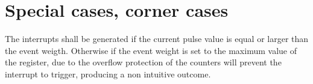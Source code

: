 \section{Special cases, corner cases}
The interrupts shall be generated if the current pulse value is equal or larger than the event weigth. Otherwise if the event weight is set to the maximum value of the register, due to the overflow protection of the counters will prevent the interrupt to trigger, producing a non intuitive outcome. \\
\\